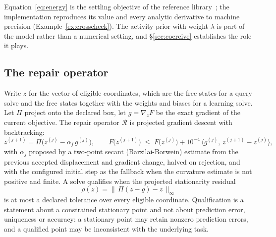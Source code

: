 \documentclass[11pt]{article}
\theoremstyle{definition}
\theoremstyle{remark}
\newcommand{\Proj}{\Pi}
\begin{document}
Equation~\eqref{eq:energy} is the settling objective of the reference library~\cite{cadence}; the
implementation reproduces its value and every analytic derivative to machine precision
(Example~\ref{ex:crosscheck}). The activity prior with weight $\lambda$ is part of the model rather
than a numerical setting, and \S\ref{sec:coercive} establishes the role it plays.

\subsection{The repair operator}
Write $z$ for the vector of eligible coordinates, which are the free states for a query solve and the
free states together with the weights and biases for a learning solve. Let $\Proj$ project onto the
declared box, let $g=\nabla_z F$ be the exact gradient of the current objective. The repair operator $\mathcal{R}$ is projected gradient descent with
backtracking:
\begin{equation}
z^{(j+1)}=\Proj\big(z^{(j)}-\alpha_j\,g^{(j)}\big),
\qquad
F\big(z^{(j+1)}\big)\;\le\;F\big(z^{(j)}\big)+10^{-4}\,\big\langle g^{(j)},\,z^{(j+1)}-z^{(j)}\big\rangle ,
\label{eq:repair}
\end{equation}
with $\alpha_j$ proposed by a two-point secant (Barzilai-Borwein) estimate from the previous accepted
displacement and gradient change, halved on rejection, and with the configured initial step as the
fallback when the curvature estimate is not positive and finite. A solve qualifies when the projected
stationarity residual
\begin{equation}
\rho(z)=\big\|\,\Proj(z-g)-z\,\big\|_\infty
\label{eq:residual}
\end{equation}
is at most a declared tolerance over every eligible coordinate. Qualification is a statement about a
constrained stationary point and not about prediction error, uniqueness or accuracy: a stationary
point may retain nonzero prediction errors, and a qualified point may be inconsistent with the
underlying task.
\end{document}
